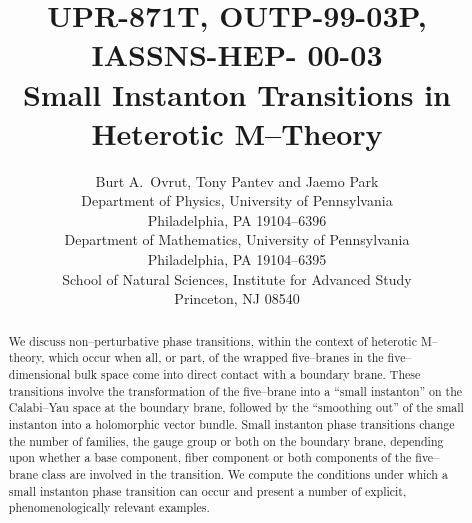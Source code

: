 \documentclass[a4paper,12pt]{article}
\numberwithin{equation}{section}
\providecommand{\ns}{\normalsize}
\theoremstyle{plain}
\begin{document}

\begin{titlepage}

\vspace{-5cm}

\title{
   \hfill{\ns UPR-871T, OUTP-99-03P, IASSNS-HEP- 00-03} \\[1em]
   {\LARGE Small Instanton Transitions  
     in Heterotic M--Theory} \\[1em] } 
\author{
   Burt A.~Ovrut\coordHE{}, Tony Pantev\coordHE{}
   and Jaemo Park\coordHE{}\\[0.5em]
   {\ns {}\coordHE{}Department of Physics, University of Pennsylvania} \\[-0.4em]
   {\ns Philadelphia, PA 19104--6396}\\
   {\ns {}\coordHE{}Department of Mathematics, University of Pennsylvania} 
   \\[-0.4em]
   {\ns Philadelphia, PA 19104--6395}\\ 
   {\ns {}\coordHE{}School of Natural Sciences, 
    Institute for Advanced Study} \\[-0.4em]
   {\ns Princeton, NJ 08540}\\}
\date{}

\maketitle

\begin{abstract}

We discuss non--perturbative phase transitions, within the context of heterotic
M--theory, which occur when all, or part, of the wrapped five--branes in the
five--dimensional bulk space come into direct contact with a
boundary brane. These transitions involve the transformation of the
five--brane into a ``small instanton'' on the Calabi--Yau space at the
boundary brane, followed by the ``smoothing out'' of the small instanton into
a holomorphic vector bundle. Small instanton phase transitions change the
number of families, the gauge group or both on the boundary brane,
depending upon whether a base component, fiber component or both components
of the five--brane class are involved in the transition. We compute the
conditions under which a small instanton phase transition can occur and 
present a number of explicit, phenomenologically relevant examples.
 
\end{abstract}

\thispagestyle{empty}

\end{titlepage}
\end{document}
